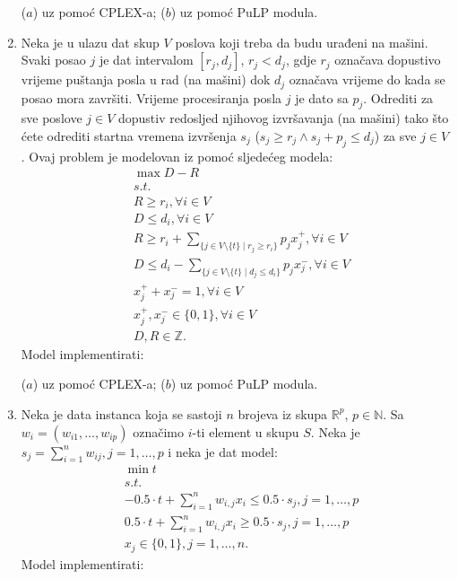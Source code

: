 \documentclass[a4paper, utf8, 11pt, colorlinks]{book}
\theoremstyle{definition}
\begin{document}
\begin{enumerate}
      ($a$) uz pomoć CPLEX-a; ($b$) uz pomoć PuLP modula. 
   \item   %
   Neka je u ulazu dat skup $V$ poslova koji treba da budu urađeni na mašini. Svaki posao $j$ je dat intervalom $[r_j, d_j]$, $r_j < d_j$, gdje $r_j$ označava dopustivo vrijeme puštanja posla u rad (na mašini) dok $d_j$ označava vrijeme do kada se posao mora završiti.  
   Vrijeme procesiranja posla $j$ je dato sa $p_j$. 
   Odrediti za sve poslove $j  \in V$ dopustiv redosljed njihovog izvršavanja (na mašini) tako što ćete odrediti startna vremena izvršenja $s_j$ ($s_j \geq r_j \wedge s_j + p_j \leq d_j$) za sve $j \in V$. Ovaj problem je modelovan iz pomoć sljedećeg modela:
   \begin{align*}
          &\max D - R \\
          & s.t. \\
          & R \geq r_i, \forall i \in V \\
          & D \leq d_i, \forall i \in V \\
          & R \geq r_i + \sum_{ \{ j \in V \setminus \{t\} \mid r_j \geq r_i \} } p_j x_j^+, \forall i \in V \\
          & D \leq d_i -  \sum_{ \{ j \in V \setminus \{t\} \mid d_j \leq d_i \}} p_j x_j^-, \forall i \in V \\
          & x_j^+ + x_j^-  = 1, \forall i \in V \\
          &   x_j^+, x_j^- \in \{0, 1\}, \forall i \in V \\
          & D, R \in \mathbb{Z}. 
   \end{align*} 
          Model implementirati:
    
    ($a$) uz pomoć CPLEX-a; ($b$) uz pomoć PuLP modula. 
    \item Neka je data instanca koja se sastoji  $n$ brojeva iz skupa $\mathbb{R}^p$, $p\in \mathbb{N}$. Sa $w_{i}=(w_{i1},\ldots, w_{ip})$ označimo $i$-ti element u skupu $S$. 
    Neka je $s_j = \sum_{i=1}^n w_{ij}, j=1,\ldots, p$ i neka je dat model:
    \begin{align*}
    	&\min t  \\
    	& s.t. \\
    	&-0.5 \cdot t + \sum_{i=1}^n w_{i,j}    x_i  \leq 0.5 \cdot s_j, j=1,\ldots,p \\
    	& 0.5 \cdot t + \sum_{i=1}^n w_{i,j} x_i  \geq 0.5 \cdot s_j, j=1,\ldots,p \\
    	& x_j \in \{0, 1\}, j = 1,\ldots,n.
    \end{align*}
             Model implementirati:
     

\end{enumerate}
\end{document}

